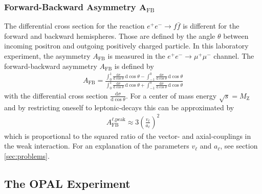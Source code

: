\documentclass[11pt, a4paper]{article}
\numberwithin{equation}{section}
\newcommand\dinf[1]{ \,\mathrm{d}#1 }
\newcommand\deriv[2] { \frac{\mathrm{d} #1}{\mathrm{d} #2} }
\begin{document}
\subsubsection{Forward-Backward Asymmetry A$_\mathrm{FB}$}
\label{sec:afb}
The differential cross section for the reaction $e^+e^- \rightarrow f\bar{f}$ is different for the forward and backward hemispheres.
Those are defined by the angle $\theta$ between incoming positron and outgoing positively charged particle.
In this laboratory experiment, the asymmetry $A_\mathrm{FB}$ is measured in the $e^+e^- \rightarrow \mu^+\mu^-$ channel. 
The forward-backward asymmetry $A_\mathrm{FB}$ is defined by \cite{instructions}
\begin{align*}
	A_\mathrm{FB}=\frac{\int_{0}^{1}{\deriv{\sigma}{\cos\theta}}\dinf{\cos\theta}-\int_{-1}^{0}{\deriv{\sigma}{\cos\theta}}\dinf{\cos\theta}}{\int_{0}^{1}{\deriv{\sigma}{\cos\theta}}\dinf{\cos\theta}+\int_{-1}^{0}{\deriv{\sigma}{\cos\theta}}\dinf{\cos\theta}}
\end{align*}
with the differential cross section $\deriv{\sigma}{\cos\theta}$.
For a center of mass energy $\sqrt{s}=M_\mathrm{Z}$ and by restricting oneself to leptonic-decays this can be approximated by \cite{instructions}
\begin{align*}
	A_\mathrm{FB}^{\ell\text{,peak}}\approx 3\left(\frac{v_\ell}{a_\ell}\right)^2
\end{align*}
which is proportional to the squared ratio of the vector- and axial-couplings in the weak interaction.
For an explanation of the parameters $v_\ell$ and $a_\ell$, see section \ref{sec:problems}.

\subsection{The OPAL Experiment}
\end{document}

